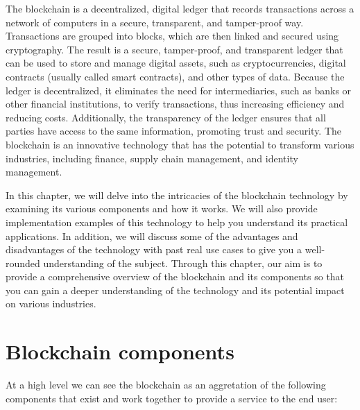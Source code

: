 \documentclass[target=mst,aauheader=]{thud}
\begin{document}
The blockchain is a decentralized, digital ledger that records transactions across a network of computers in a secure, transparent, and tamper-proof way. Transactions are grouped into blocks, which are then linked and secured using cryptography. The result is a secure, tamper-proof, and transparent ledger that can be used to store and manage digital assets, such as cryptocurrencies, digital contracts (usually called smart contracts), and other types of data. Because the ledger is decentralized, it eliminates the need for intermediaries, such as banks or other financial institutions, to verify transactions, thus increasing efficiency and reducing costs. Additionally, the transparency of the ledger ensures that all parties have access to the same information, promoting trust and security. The blockchain is an innovative technology that has the potential to transform various industries, including finance, supply chain management, and identity management.

\indent In this chapter, we will delve into the intricacies of the blockchain technology by examining its various components and how it works. We will also provide implementation examples of this technology to help you understand its practical applications. In addition, we will discuss some of the advantages and disadvantages of the technology with past real use cases to give you a well-rounded understanding of the subject. Through this chapter, our aim is to provide a comprehensive overview of the blockchain and its components so that you can gain a deeper understanding of the technology and its potential impact on various industries.

\section{Blockchain components}

At a high level we can see the blockchain as an aggretation of the following components that exist and work together to provide a service to the end user:
\end{document}
